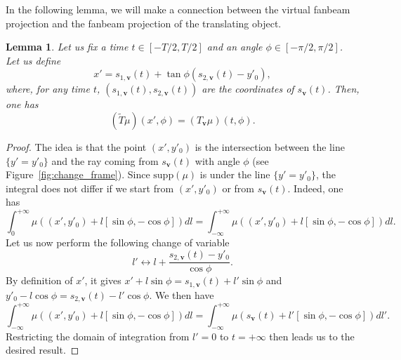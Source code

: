 \documentclass[a4paper]{article}
\numberwithin{equation}{section}
\newcommand{\supp}{\textrm{supp}}
\newcommand{\bv}{\mathbf{v}}
\newcommand{\Tbv}{T_{\mathbf{v}}}
\newcommand{\sbv}{s_{\mathbf{v}}}
\newtheorem{lemma}{Lemma}
\begin{document}
In the following lemma, we will make a connection between the virtual fanbeam projection and the fanbeam projection of the translating object.
\begin{lemma}
	Let us fix a time $t \in \left[ -T/2, T/2\right]$ and an angle $\phi \in \left[ -\pi/2, \pi/2\right]$. Let us define
	\begin{equation}
		x' = s_{1,\bv}(t) + \tan \phi \left( s_{2,\bv}(t) - y'_0 \right),
	\end{equation}
	where, for any time $t$, $\left( s_{1,\bv}(t), s_{2,\bv}(t) \right)$ are the coordinates of $\sbv(t)$.
	Then, one has
	\begin{equation}
		\left( \tilde{T}\mu	\right)(x',\phi) = \left( \Tbv \mu	\right)(t,\phi).
	\end{equation}
\label{lem:T_x_t}
\end{lemma}
\begin{proof}
The idea is that the point $(x',y'_0)$ is the intersection between the line $\{y'=y'_0\}$ and the ray coming from $\sbv(t)$ with angle $\phi$ (see Figure~\ref{fig:change_frame}). Since $\supp(\mu)$ is under the line $\{ y'=y'_0 \}$, the integral does not differ if we start from $(x',y'_0)$ or from $\sbv(t)$. Indeed, one has
\begin{equation}
	\int_0^{+\infty} \mu \left( (x',y'_0) + l \left[ \sin \phi, -\cos \phi \right] \right) dl = \int_{-\infty}^{+\infty} \mu \left( (x',y'_0) + l \left[ \sin \phi, -\cos \phi \right] \right) dl.
\end{equation}
Let us now perform the following change of variable
\begin{equation}
	l' \leftrightarrow l + \frac{s_{2,\bv}(t) - y'_0}{\cos \phi}.
\end{equation}
By definition of $x'$, it gives $x' + l \sin \phi = s_{1,\bv}(t) + l' \sin \phi$ and $y'_0 - l \cos \phi = s_{2,\bv}(t) - l' \cos \phi$. We then have
\begin{equation}
	\int_{-\infty}^{+\infty} \mu \left( (x',y'_0) + l \left[ \sin \phi, -\cos \phi \right] \right) dl = \int_{-\infty}^{+\infty} \mu \left( \sbv(t) + l' \left[ \sin \phi, -\cos \phi \right] \right) dl'.
\end{equation}
Restricting the domain of integration from $l'=0$ to $t = + \infty$ then leads us to the desired result.
\end{proof}
\end{document}

